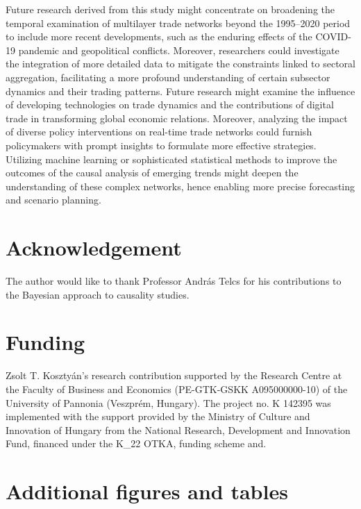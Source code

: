 \documentclass[preprint, 3p,
authoryear]{elsarticle} %
\begin{document}
Future research derived from this study might concentrate on broadening
the temporal examination of multilayer trade networks beyond the
1995--2020 period to include more recent developments, such as the
enduring effects of the COVID-19 pandemic and geopolitical conflicts.
Moreover, researchers could investigate the integration of more detailed
data to mitigate the constraints linked to sectoral aggregation,
facilitating a more profound understanding of certain subsector dynamics
and their trading patterns. Future research might examine the influence
of developing technologies on trade dynamics and the contributions of
digital trade in transforming global economic relations. Moreover,
analyzing the impact of diverse policy interventions on real-time trade
networks could furnish policymakers with prompt insights to formulate
more effective strategies. Utilizing machine learning or sophisticated
statistical methods to improve the outcomes of the causal analysis of
emerging trends might deepen the understanding of these complex
networks, hence enabling more precise forecasting and scenario planning.

\section*{Acknowledgement}\label{acknowledgement}

The author would like to thank Professor András Telcs for his
contributions to the Bayesian approach to causality studies.

\section*{Funding}\label{funding}

Zsolt T. Kosztyán's research contribution supported by the Research
Centre at the Faculty of Business and Economics (PE-GTK-GSKK
A095000000-10) of the University of Pannonia (Veszprém, Hungary). The
project no. K 142395 was implemented with the support provided by the
Ministry of Culture and Innovation of Hungary from the National
Research, Development and Innovation Fund, financed under the K\_22
OTKA, funding scheme and.



\clearpage

\appendix

\section{Additional figures and
tables}\label{additional-figures-and-tables}
\end{document}
